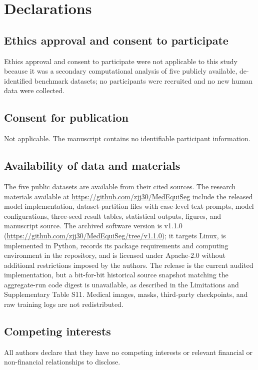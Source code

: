 \section*{Declarations}

\subsection*{Ethics approval and consent to participate}
Ethics approval and consent to participate were not applicable to this study because it was
a secondary computational analysis of five publicly available, de-identified benchmark
datasets; no participants were recruited and no new human data were collected.

\subsection*{Consent for publication}
Not applicable. The manuscript contains no identifiable participant information.

\subsection*{Availability of data and materials}
The five public datasets are available from their cited sources. The research
materials available at \url{https://github.com/zjj30/MedEquiSeg} include the
released model implementation, dataset-partition files with case-level text
prompts, model configurations, three-seed result tables, statistical outputs,
figures, and manuscript source. The archived software version is v1.1.0
(\url{https://github.com/zjj30/MedEquiSeg/tree/v1.1.0}); it targets Linux, is
implemented in Python, records its package requirements and computing
environment in the repository, and is licensed under Apache-2.0 without
additional restrictions imposed by the authors. The release is the current
audited implementation, but a bit-for-bit historical source snapshot matching
the aggregate-run code digest is unavailable, as described in the Limitations
and Supplementary Table S11. Medical
images, masks, third-party checkpoints, and raw training logs are not
redistributed.

\subsection*{Competing interests}
All authors declare that they have no competing interests or relevant financial or
non-financial relationships to disclose.


